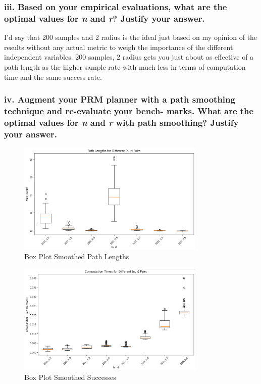 \documentclass{article}
\begin{document}
\subsubsection*{iii. Based on your empirical evaluations, what are the optimal values for \textit{n} and \textit{r}? Justify your answer.} 

I'd say that 200 samples and 2 radius is the ideal just based on my opinion of the results without any actual metric to weigh the importance of the different independent variables.
200 samples, 2 radius gets you just about as effective of a path length as the higher sample rate with much less in terms of computation time and the same success rate.

\subsubsection*{iv. Augment your PRM planner with a path smoothing technique and re-evaluate your bench-
marks. What are the optimal values for \textit{n} and \textit{r} with path smoothing? Justify your answer.}

\begin{figure}[h]
    \centering
    \includegraphics[width=0.8\textwidth]{e1a4pathLengths.png}
    \caption{Box Plot Smoothed Path Lengths}
    \label{fig:e1a4pathLengths}
\end{figure}

\begin{figure}[h]
    \centering
    \includegraphics[width=0.8\textwidth]{e1a4times.png}
    \caption{Box Plot Smoothed Successes}
    \label{fig:e1a4times}
\end{figure}
\end{document}
